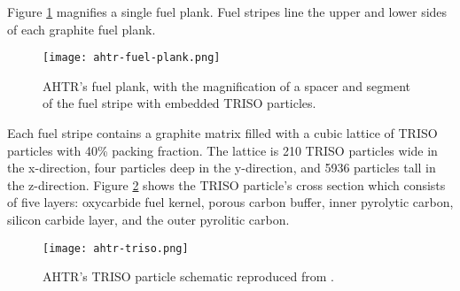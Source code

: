 Figure \ref{fig:ahtr-fuel-plank} magnifies a single fuel plank. 
Fuel stripes line the upper and lower sides of each graphite fuel plank. 
\begin{figure}[htbp]
    \centering
    \texttt{[image: ahtr-fuel-plank.png]} 
            \hspace{0.5cm}
    \caption{\acrfull{AHTR}'s fuel plank, with the magnification of 
    a spacer and segment of the fuel stripe with embedded \gls{TRISO} particles.}
    \label{fig:ahtr-fuel-plank}
\end{figure}
Each fuel stripe contains a graphite matrix filled with a cubic lattice of 
\gls{TRISO} particles with 40\% packing fraction. 
The lattice is 210 \gls{TRISO} particles wide in the x-direction, four particles 
deep in the y-direction, and 5936 particles tall in the z-direction. 
Figure \ref{fig:ahtr-triso} shows the \gls{TRISO} particle's cross section 
which consists of five layers: oxycarbide fuel kernel, porous carbon buffer, 
inner pyrolytic carbon, silicon carbide layer, and the outer pyrolitic carbon. 
\begin{figure}[htbp]
    \centering
    \texttt{[image: ahtr-triso.png]} 
    \caption{\acrlong{AHTR}'s TRISO particle schematic reproduced from 
    \cite{petrovic_benchmark_2021}.}
    \label{fig:ahtr-triso}
\end{figure}

